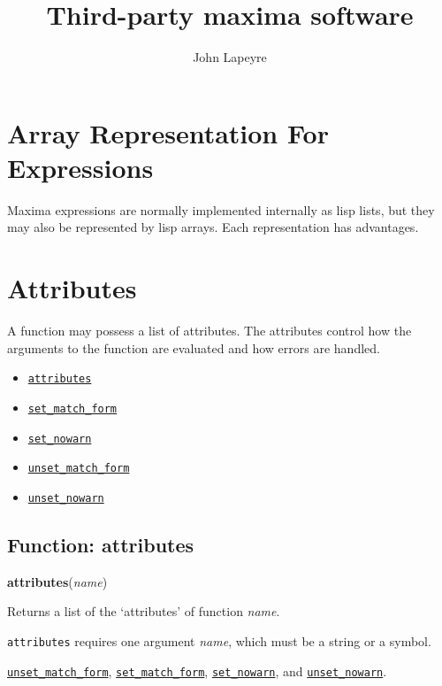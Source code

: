 \documentclass[]{article}
\begin{document}
\title{Third-party maxima software}
\author{John Lapeyre}
\maketitle
\tableofcontents
\section{Array Representation For Expressions}

 Maxima expressions are normally implemented internally as lisp lists,
   but they may also be represented by lisp arrays. Each representation has
   advantages.
\section{Attributes}

 A function may possess a list of attributes. The attributes control how the arguments
 to the function are evaluated and how errors are handled.
\begin{itemize}
\item \hyperlink{attributes}{{\tt attributes}}
\item \hyperlink{set_match_form}{{\tt set\_match\_form}}
\item \hyperlink{set_nowarn}{{\tt set\_nowarn}}
\item \hyperlink{unset_match_form}{{\tt unset\_match\_form}}
\item \hyperlink{unset_nowarn}{{\tt unset\_nowarn}}
\end{itemize}
\subsection{Function: attributes\label{sec:attributes}}
\hypertarget{attributes}{}
{\bf attributes}({\it name})



\vspace{5 pt}
Returns a list of the `attributes' of function {\it name}. 

\vspace{5 pt}

   {\tt attributes} requires one argument {\it name}, which must be a string or a symbol.


\vspace{5 pt}


  \hyperlink{unset_match_form}{{\tt unset\_match\_form}}, \hyperlink{set_match_form}{{\tt set\_match\_form}}, \hyperlink{set_nowarn}{{\tt set\_nowarn}}, and \hyperlink{unset_nowarn}{{\tt unset\_nowarn}}.
\end{document}
